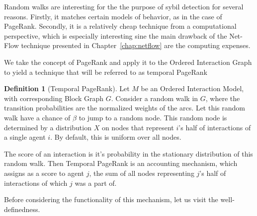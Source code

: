 \documentclass[a4paper,11pt]{book}
\theoremstyle{definition}
\newtheorem{definition}{Definition}
\begin{document}
Random walks are interesting for the the purpose of sybil detection for several reasons.
Firstly, it matches certain models of behavior, as in the case of PageRank. Secondly, it 
is a relatively cheap technique from a computational perspective, which is especially
interesting sine the main
drawback of the Net-Flow technique presented in Chapter~\ref{chap:netflow} 
are the computing expenses.

We take the concept of PageRank and apply it to the Ordered Interaction Graph to
yield a technique that will be referred to as temporal PageRank

\begin{definition}[Temporal PageRank]
    Let $M$ be an Ordered Interaction Model, with corresponding Block Graph $G$.
    Consider a random walk in $G$, where the transition probabilities are the normalized
    weights of the arcs. Let this random walk have a chance of $\beta$ to jump to a random node.
    This random node is determined by a distribution $X$ on nodes that represent $i$'s half of interactions of
    a single agent $i$. By default, this is uniform over all nodes.

    The score of an interaction is it's probability in the stationary distribution of this random walk.
    Then Temporal PageRank is an accounting mechanism, which assigns as a score to agent $j$, the
    sum of all nodes representing $j$'s half of interactions of which $j$ was a part of.
\end{definition}


Before considering the functionality of this mechanism, let us visit the well-definedness.
\end{document}
